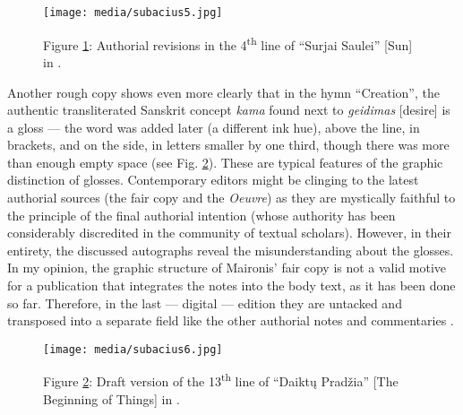 \documentclass{article}
\begin{document}
\begin{figure}[H]
    \centering
    \texttt{[image: media/subacius5.jpg]}
    \caption{Figure \ref{fig:subacius5}: Authorial revisions in the 4\textsuperscript{th} line of ``Surjai Saulei'' {[}Sun{]} in \citealt[9v]{maironis_daiktu_1922}.}
    \label{fig:subacius5}
\end{figure}

Another rough copy shows even more clearly that in the hymn
``Creation'', the authentic transliterated Sanskrit concept \emph{kama}
found next to \emph{geidimas} {[}desire{]} is a gloss –– the word was
added later (a different ink hue), above the line, in brackets, and
on the side, in letters smaller by one third, though there was more than
enough empty space (see Fig. \ref{fig:subacius6}). These are typical features of the
graphic distinction of glosses. Contemporary editors might be clinging
to the latest authorial sources (the fair copy and the \emph{Oeuvre}) as
they are mystically faithful to the principle of the final authorial
intention (whose authority has been considerably discredited in the
community of textual scholars). However, in their entirety, the
discussed autographs reveal the misunderstanding about the glosses. In
my opinion, the graphic structure of Maironis' fair copy is not a valid
motive for a publication that integrates the notes into the body text, as it has been done so far.
Therefore, in the last –– digital –– edition they are untacked and
transposed into a separate field like the other authorial notes and
commentaries \citep{maironis_pavasario_2020}.

\begin{figure}[H]
    \centering
    \texttt{[image: media/subacius6.jpg]}
    \caption{Figure \ref{fig:subacius6}: Draft version of the 13\textsuperscript{th} line of ``Daiktų Pradžia'' {[}The Beginning of Things{]} in \citealt[6v]{maironis_daiktu_1922}.}
    \label{fig:subacius6}
\end{figure}
\end{document}
